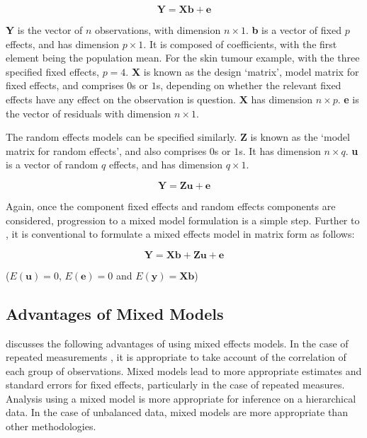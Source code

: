 \documentclass[12pt, a4paper]{report}
\theoremstyle{plain}
\theoremstyle{definition}
\theoremstyle{remark}
\begin{document}
\begin{equation}
\textbf{Y} = \textbf{Xb} + \textbf{e}
\end{equation}

\textbf{Y} is the vector of $n$ observations, with dimension $n
\times 1$. \textbf{b} is a vector of fixed $p$ effects, and has
dimension $p \times 1$. It is composed of coefficients, with the
first element being the population mean. For the skin tumour
example, with the three specified fixed effects, $p=4$. \textbf{X}
is known as the design `matrix', model matrix for fixed effects,
and comprises $0$s or $1$s, depending on whether the relevant
fixed effects have any effect on the observation is question.
\textbf{X} has dimension $n \times p$. \textbf{e} is the vector of
residuals with dimension $n \times 1$.

The random effects models can be specified similarly. \textbf{Z}
is known as the `model matrix for random effects', and also
comprises $0$s or $1$s. It has dimension $n \times q$. \textbf{u}
is a vector of random $q$ effects, and has dimension $q \times 1$.

\begin{equation}
\textbf{Y} = \textbf{Zu} + \textbf{e}
\end{equation}

Again, once the component fixed effects and random effects
components are considered, progression to a mixed model
formulation is a simple step. Further to \citet{lw82}, it is
conventional to formulate a mixed effects model in matrix form as
follows:

\begin{equation}
\textbf{Y} = \textbf{Xb} + \textbf{Zu} + \textbf{e}
\end{equation}

($E(\textbf{u})=0$, $E(\textbf{e})=0 $ and $E(\textbf{y}) =
\textbf{Xb}$)

\subsection{Advantages of Mixed Models}
\citet{BrownPrescott} discusses the  following advantages of using
mixed effects models. In the case of repeated measurements , it is
appropriate to take account of the correlation of each group of
observations. Mixed models lead to more appropriate estimates and
standard errors for fixed effects, particularly in the case of
repeated measures. Analysis using a mixed model is more
appropriate for inference on a hierarchical data. In the case of
unbalanced data, mixed models are more appropriate than other
methodologies.
\end{document}
